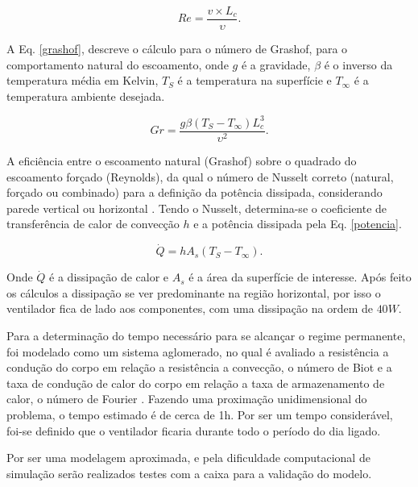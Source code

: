 \begin{equation}
	Re= \frac{v \times L_c}{\upsilon}.
	\label{reynolds}
\end{equation}

A Eq. \ref{grashof}, descreve o cálculo para o número de Grashof, para o comportamento natural do escoamento, onde $g$ é a gravidade, $\beta$ é o inverso da temperatura média em Kelvin, $T_S$ é a temperatura na superfície e $T_{\infty}$ é a temperatura ambiente desejada.

\begin{equation}
	Gr= \frac{g \beta (T_S-T_{\infty})L_c^3}{\upsilon^2}.
	\label{grashof}
\end{equation}

A eficiência entre o escoamento natural (Grashof) sobre o quadrado do escoamento forçado (Reynolds), da qual o número de Nusselt correto (natural, forçado ou combinado) para a definição da potência dissipada, considerando parede vertical ou horizontal \cite{livro_transcal}. Tendo o Nusselt, determina-se o coeficiente de transferência de calor de convecção $h$ e a potência dissipada pela Eq. \ref{potencia}.

\begin{equation}
	\dot{Q}= hA_s(T_S-T_{\infty}).
	\label{potencia}
\end{equation}

Onde $\dot{Q}$ é a dissipação de calor e $A_s$ é a área da superfície de interesse. Após feito os cálculos a dissipação se ver predominante na região horizontal, por isso o ventilador fica de lado aos componentes, com uma dissipação na ordem de $40W$.

Para a determinação do tempo necessário para se alcançar o regime permanente, foi modelado como um sistema aglomerado, no qual é avaliado a resistência a condução do corpo em relação a resistência a convecção, o número de Biot e a taxa de condução de calor do corpo em relação a taxa de armazenamento de calor, o número de Fourier \cite{livro_transcal}. Fazendo uma proximação unidimensional do problema, o tempo estimado é de cerca de 1h. Por ser um tempo considerável, foi-se definido que o ventilador ficaria durante todo o período do dia ligado.


Por ser uma modelagem aproximada, e pela dificuldade computacional de simulação serão realizados testes com a caixa para a validação do modelo. 


